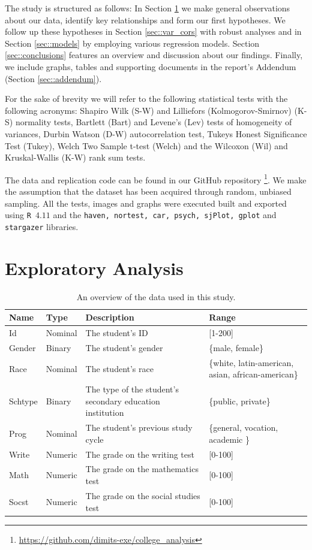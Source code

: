\documentclass[10pt, a4paper]{article}
\def\code#1{\texttt{#1}}
\begin{document}
	The study is structured as follows: In Section \ref{sec::exploratory} we make general observations about our data, identify key relationships and form our first hypotheses. We follow up these hypotheses in Section \ref{sec::var_cors} with robust analyses and in Section \ref{sec::models} by employing various regression models. Section \ref{sec::conclusions} features an overview and discussion about our findings. Finally, we include graphs, tables and supporting documents in the report's Addendum (Section \ref{sec::addendum}).
	
	For the sake of brevity we will refer to the following statistical tests with the following acronyms: Shapiro Wilk (S-W) and Lilliefors (Kolmogorov-Smirnov) (K-S) normality tests, Bartlett (Bart) and Levene's (Lev) tests of homogeneity of variances, Durbin Watson (D-W) autocorrelation test, Tukeys Honest Significance Test (Tukey), Welch Two Sample t-test (Welch) and the Wilcoxon (Wil) and Kruskal-Wallis (K-W) rank sum tests.
	
	The data and replication code can be found in our GitHub repository \footnote{\url{https://github.com/dimits-exe/college_analysis}}. We make the assumption that the dataset has been acquired through random, unbiased sampling. All the tests, images and graphs were executed built and exported using \code{R $4.11$} and the \code{haven, nortest, car, psych, sjPlot, gplot} and \code{stargazer} libraries.
	
	\section{Exploratory Analysis}
	\label{sec::exploratory}
	
	\begin{table}
		\centering
		\begin{tabular}
			{ |p{1cm} p{1cm} p{5cm} p{3cm}| }
			\hline
			\textbf{Name} & \textbf{Type} & \textbf{Description} & \textbf{Range}\\
			\hline
			Id  & Nominal & The student's ID & [1-200] \\
			Gender  & Binary & The student's gender & \{male, female\} \\
			Race  & Nominal & The student's race & \{white, latin-american, asian, african-american\} \\
			Schtype  & Binary & The type of the student's secondary education institution & \{public, private\} \\
			Prog  & Nominal & The student's previous study cycle  & \{general, vocation, academic \} \\
			Write  & Numeric & The grade on the writing test  & [0-100] \\
			Math  & Numeric & The grade on the mathematics test  & [0-100] \\
			Socst  & Numeric & The grade on the social studies test & [0-100] \\
			\hline
		\end{tabular}
		\caption{An overview of the data used in this study.}
		\label{tab::dataset}
	\end{table}
	
\end{document}
